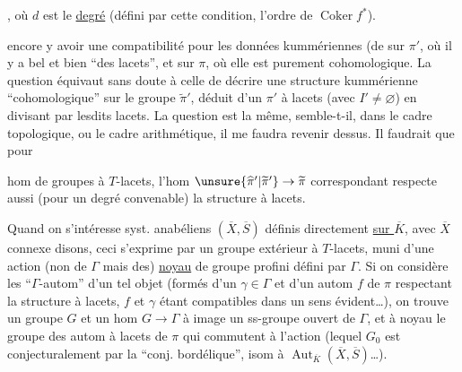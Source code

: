 

,
où $d$ est le \uline{degré} (défini  
par cette condition,
   l'ordre de $\operatorname{Coker}f^{*}$). 

 
encore y avoir une compatibilité
pour les données kummériennes (de
 sur $\pi'$, où il y a bel et
bien ``des lacets'', et sur $\pi$, où elle est
purement cohomologique. \unsure{\S} La question
équivaut sans doute à celle de décrire
une structure kummérienne ``cohomologique''
sur le groupe $\widetilde\pi'$, déduit d'un $\pi'$ à
lacets (avec $I'\ne\varnothing$) en divisant par
lesdits lacets. La question est la
même, semble-t-il, dans le cadre topologique,
ou le cadre arithmétique, il me faudra
revenir dessus. Il faudrait que pour 



hom  de groupes à $T$-lacets, l'hom
$\unsure{\widehat\pi'|\widetilde\pi'}\to\widetilde\pi$ correspondant respecte aussi (pour
un degré convenable) la structure à lacets.

Quand on s'intéresse  syst. anabéliens
$(\overline X,\overline S)$ définis directement \uline{sur $\overline K$}, avec $\overline X$
connexe disons, ceci s'exprime
par un groupe extérieur à $T$-lacets,
muni d'une action (non de $\Gamma$ mais
des) \uline{noyau} de groupe profini défini par $\Gamma$.
Si on considère les  ``$\Gamma$-autom'' d'un
tel objet (formés d'un $\gamma\in\Gamma$ et
d'un autom  $f$ de $\pi$ respectant la
structure à lacets, $f$ et $\gamma$ étant compatibles
dans un sens évident\dots), on trouve
un groupe  $G$ et un hom  $G\to\Gamma$
à image un ss-groupe ouvert de $\Gamma$, et
à noyau  le groupe des autom  à
lacets de $\pi$ qui commutent à l'action 
  (lequel $G_0$ est conjecturalement par la
``conj. bordélique'', isom à  $\operatorname{Aut}_{\overline K}(\overline X,\overline S)$\dots).

